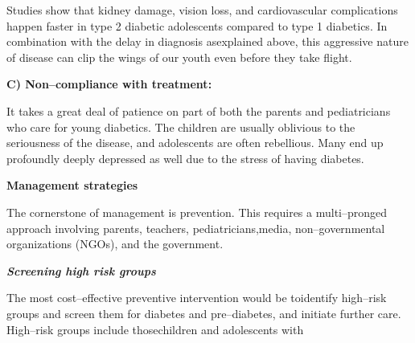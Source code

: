 Studies show that kidney damage, vision loss, and cardiovascular complications happen faster in type 2 diabetic adolescents compared to type 1 diabetics. In combination with the delay in diagnosis as\break explained above, this aggressive nature of disease can clip the wings of our youth even before they take flight.

\noindent\textbf{C) Non–compliance with treatment:}

It takes a great deal of patience on part of both the parents and pediatricians who care for young diabetics. The children are usually oblivious to the seriousness of the disease, and adolescents are often rebellious. Many end up profoundly deeply depressed as well due to the stress of having diabetes.


\noindent\textbf{Management strategies}

The cornerstone of management is prevention. This requires a multi–pronged approach involving parents, teachers, pediatricians,\break media, non–governmental organizations (NGOs), and the government.

\noindent\textbf{\textit{Screening high risk groups}}

The most cost–effective preventive intervention would be to\break identify high–risk groups and screen them for diabetes and pre–\break dia\-betes, and initiate further care. High–risk groups include those\break children and adolescents with

